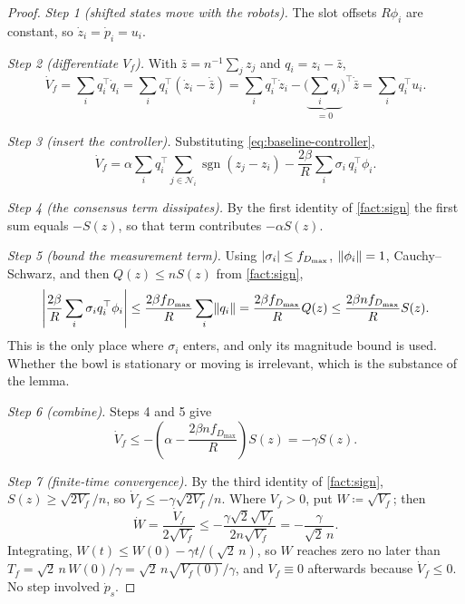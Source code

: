 \documentclass[11pt,a4paper]{article}
\theoremstyle{plain}
\theoremstyle{definition}
\DeclareMathOperator{\sgn}{sgn}
\DeclarePairedDelimiter{\norm}{\lVert}{\rVert}
\DeclarePairedDelimiter{\abs}{\lvert}{\rvert}
\begin{document}
\begin{proof}
\emph{Step 1 (shifted states move with the robots).} The slot offsets $R\phi_i$ are constant, so
$\dot z_i=\dot p_i=u_i$.

\emph{Step 2 (differentiate $V_f$).} With $\bar z=n^{-1}\sum_jz_j$ and $q_i=z_i-\bar z$,
\begin{equation*}
    \dot V_f=\sum_iq_i^{\top}\dot q_i
    =\sum_iq_i^{\top}\left(\dot z_i-\dot{\bar z}\right)
    =\sum_iq_i^{\top}\dot z_i-\Big(\underbrace{\sum_iq_i}_{=0}\Big)^{\!\top}\dot{\bar z}
    =\sum_iq_i^{\top}u_i.
\end{equation*}

\emph{Step 3 (insert the controller).} Substituting \eqref{eq:baseline-controller},
\begin{equation*}
    \dot V_f=\alpha\sum_iq_i^{\top}\sum_{j\in\mathcal{N}_i}\sgn\!\left(z_j-z_i\right)
    -\frac{2\beta}{R}\sum_i\sigma_i\,q_i^{\top}\phi_i.
\end{equation*}

\emph{Step 4 (the consensus term dissipates).} By the first identity of \cref{fact:sign} the
first sum equals $-S(z)$, so that term contributes $-\alpha S(z)$.

\emph{Step 5 (bound the measurement term).} Using $\abs{\sigma_i}\leq f_{D_{\max}}$,
$\norm{\phi_i}=1$, Cauchy--Schwarz, and then $Q(z)\leq nS(z)$ from \cref{fact:sign},
\begin{equation*}
    \abs*{\frac{2\beta}{R}\sum_i\sigma_iq_i^{\top}\phi_i}
    \leq\frac{2\beta f_{D_{\max}}}{R}\sum_i\norm{q_i}
    =\frac{2\beta f_{D_{\max}}}{R}Q(z)
    \leq\frac{2\beta nf_{D_{\max}}}{R}S(z).
\end{equation*}
This is the only place where $\sigma_i$ enters, and only its magnitude bound is used. Whether the
bowl is stationary or moving is irrelevant, which is the substance of the lemma.

\emph{Step 6 (combine).} Steps 4 and 5 give
\begin{equation}\label{eq:vf-decrease}
    \dot V_f\leq-\left(\alpha-\frac{2\beta nf_{D_{\max}}}{R}\right)S(z)=-\gamma S(z).
\end{equation}

\emph{Step 7 (finite-time convergence).} By the third identity of \cref{fact:sign},
$S(z)\geq\sqrt{2V_f}/n$, so $\dot V_f\leq-\gamma\sqrt{2V_f}/n$. Where $V_f>0$, put
$W\coloneqq\sqrt{V_f}$; then
\begin{equation*}
    \dot W=\frac{\dot V_f}{2\sqrt{V_f}}
    \leq-\frac{\gamma\sqrt2\sqrt{V_f}}{2n\sqrt{V_f}}
    =-\frac{\gamma}{\sqrt2\,n}.
\end{equation*}
Integrating, $W(t)\leq W(0)-\gamma t/(\sqrt2\,n)$, so $W$ reaches zero no later than
$T_f=\sqrt2\,n\,W(0)/\gamma=\sqrt2\,n\sqrt{V_f(0)}/\gamma$, and $V_f\equiv0$ afterwards because
$\dot V_f\leq0$. No step involved $\dot p_s$.
\end{proof}
\end{document}
